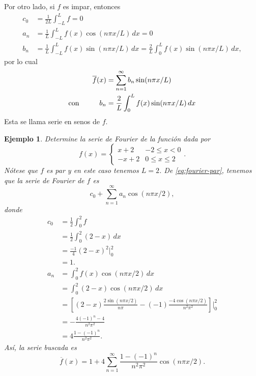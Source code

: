 \documentclass[11pt,letterpaper,draft]{report}
\newtheorem{example}[defn]{Ejemplo}
\newcommand\<{\langle}
\renewcommand\>{\rangle}
\begin{document}
Por otro lado, si $f$ es impar, entonces
\begin{align*}
  c_0 &= \frac{1}{2L}\int_{-L}^L f = 0 \\
  a_n
    &= \frac{1}{L}\int_{-L}^L f(x)\cos(n\pi x/L)\,dx
    = 0 \\
  b_n
    &= \frac{1}{L}\int_{-L}^L f(x)\sin(n\pi x/L)\,dx
    = \frac{2}{L}\int_{0}^L f(x)\sin(n\pi x/L)\,dx,
\end{align*}
por lo cual
\begin{equation}\label{eq:fourier-impar}
\begin{aligned}
  \overline{f}(x)
  &=
  \sum_{n=1}^{\infty}b_n\sin(n\pi x/L) \\
  \text{con}\hspace{10mm}
  b_n
  &= \frac{2}{L}\int_{0}^L f(x)\sin(n\pi x/L)\,dx
\end{aligned}
\end{equation}
Esta se llama serie en senos de $f$.

\begin{example}
  Determine la serie de Fourier de la función dada por
  \[
    f(x) =
    \begin{cases}
      x+2 & -2\leq x<0 \\
      -x+2 & 0\leq x\leq 2
    \end{cases}
  .\]
  Nótese que $f$ es par y en este caso tenemos $L=2$.
  De \eqref{eq:fourier-par}, tenemos que la serie de Fourier de $f$ es
  \[
    c_0+\sum_{n=1}^{\infty}a_n\cos(n\pi x /2)
  ,\]
  donde
  \begin{align*}
    c_0
    &= \frac{1}{2}\int_{0}^{2}f \\
    &= \frac{1}{2}\int_{0}^{2}(2-x)\,dx \\
    &= \frac{-1}{4}(2-x)^{2}\Big|_{0}^{2} \\
    &= 1. \\
    a_n
    &= \int_{0}^{2}f(x)\cos(n\pi x /2)\,dx \\
    &= \int_{0}^{2}(2-x)\cos(n\pi x /2)\,dx \\
    &=
    \left[
      (2-x)\frac{2\sin(n\pi x /2)}{n\pi}
      -(-1) \frac{-4\cos(n\pi x /2)}{n^{2}\pi^{2}}
    \right]\Big|_{0}^{2}
    \\
    &=
      -\frac{4(-1)^{n}-4}{n^{2}\pi^{2}}
    \\
    &= 4\frac{1-(-1)^{n}}{n^{2}\pi^{2}}.
  \end{align*}
  Así, la serie buscada es
  \[
    \overline{f}(x)
    =
    1 + 4 \sum_{n=1}^{\infty}
    \frac{1-(-1)^{n}}{n^{2}\pi^{2}}\cos(n\pi x / 2)
  .\]
\end{example}
\end{document}
